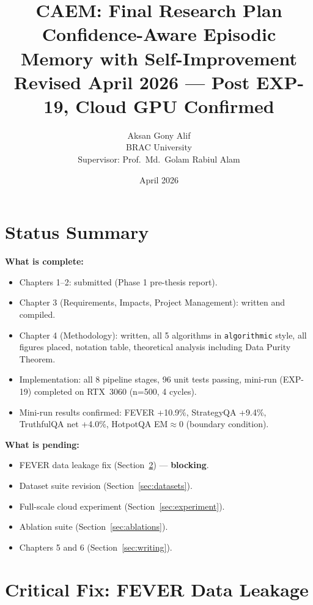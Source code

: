 \documentclass[12pt,a4paper]{article}
\title{\textbf{CAEM: Final Research Plan}\\[0.4em]
\large Confidence-Aware Episodic Memory with Self-Improvement\\[0.2em]
\normalsize Revised April 2026 --- Post EXP-19, Cloud GPU Confirmed}
\author{Aksan Gony Alif\\
BRAC University\\
Supervisor: Prof.\ Md.\ Golam Rabiul Alam}
\date{April 2026}
\begin{document}
\maketitle
\tableofcontents
\newpage

\section{Status Summary}

\begin{mdframed}[style=infobox]
\textbf{What is complete:}
\begin{itemize}[noitemsep]
  \item Chapters 1--2: submitted (Phase 1 pre-thesis report).
  \item Chapter 3 (Requirements, Impacts, Project Management): written and compiled.
  \item Chapter 4 (Methodology): written, all 5 algorithms in \texttt{algorithmic} style,
        all figures placed, notation table, theoretical analysis including Data Purity Theorem.
  \item Implementation: all 8 pipeline stages, 96 unit tests passing, mini-run (EXP-19)
        completed on RTX~3060 (n=500, 4 cycles).
  \item Mini-run results confirmed: FEVER +10.9\%, StrategyQA +9.4\%,
        TruthfulQA net +4.0\%, HotpotQA EM$\approx$0 (boundary condition).
\end{itemize}

\textbf{What is pending:}
\begin{itemize}[noitemsep]
  \item FEVER data leakage fix (Section~\ref{sec:fever-fix}) --- \textcolor{fixred}{\textbf{blocking}}.
  \item Dataset suite revision (Section~\ref{sec:datasets}).
  \item Full-scale cloud experiment (Section~\ref{sec:experiment}).
  \item Ablation suite (Section~\ref{sec:ablations}).
  \item Chapters 5 and 6 (Section~\ref{sec:writing}).
\end{itemize}
\end{mdframed}

\section{Critical Fix: FEVER Data Leakage}
\label{sec:fever-fix}
\end{document}
